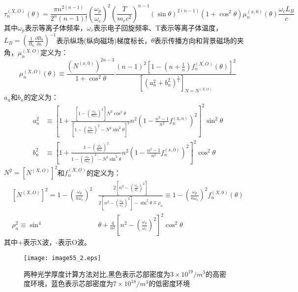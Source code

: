 \begin{equation}\label{eq:tauB}
\tau_{n}^{(X,O)}(\theta)=\frac{\pi n^{2(n-1)}}{2^{n}(n-1) !}\left(\frac{\omega_{p}}{\omega_{c}}\right)^{2}\left(\frac{T}{m_e c^{2}}\right)^{n-1}(\sin \theta)^{2(n-1)}\left(1+\cos ^{2} \theta\right) \mu_{n}^{(x, 0)}(\theta) \frac{\omega_{c} L_{B}}{c}
\end{equation}
其中$ω_p$表示等离子体频率，$ω_c$表示电子回旋频率、T表示等离子体温度，$L_B=\left(\frac{1}{B_{0}} \frac{\partial B_{0}}{\partial s}\right)^{-1}$表示纵场(纵向磁场)梯度标长，$θ$表示传播方向和背景磁场的夹角，$μ_n^{(X,O) }$定义为：
\begin{equation}
\mu_{n}^{(X, O)}(\theta) \equiv \frac{\left(N^{(x, 0)}\right)^{2 n-3}}{1+\cos ^{2} \theta} \frac{(n-1)^{2}\left[1-\left(n+\frac{1}{n}\right) f_{n}^{(X, O)}(\theta)\right]^{2}}{\left[\left(a_{n}^{2}+b_{n}^{2}\right)^{\frac{1}{2}}\right]_{N=N^{(X, O)}}}
\end{equation}
$a_n$和$b_n$的定义为：
\begin{align}
a_{n}^{2}& \equiv\left[1+\frac{\left[1-\left(\frac{\omega_{p}}{n \omega_{c}}\right)^{2}\right] N^{2} \cos ^{2} \theta}{\left[1-\left(\frac{\omega_{p}}{n \omega_{c}}\right)^{2}-N^{2} \sin ^{2} \theta\right]^{2}} n^{2}\left(1-\frac{n^{2}-1}{n^{2}} f_{n}^{(\mathrm{x}, \mathrm{o})}\right)^{2}\right]^{2} \sin ^{2} \theta \\
b_{n}^{2} &\equiv\left[1+\frac{1-\left(\frac{\omega_{p}}{n \omega_{c}}\right)^{2}}{1-\left(\frac{\omega_{p}}{n \omega_{c}}\right)^{2}-N^{2} \sin ^{2} \theta} n^{2}\left(1-\frac{n^{2}-1}{n^{2}} f_{n}^{(x, 0)}\right)^{2}\right]^{2} \cos ^{2} \theta
\end{align}
$N^2=\left [N^{(X,O)} \right]^2$和$f_n^{(X,O) }$的定义为：
\begin{align}
\left[N^{(X, O)}\right]^{2} = 1-\left(\frac{\omega_{p}}{n \omega_{c}}\right)^{2}& \frac{2\left[n^{2}-\left(\frac{\omega_{p}}{\omega_{c}}\right)^{2}\right]}{2\left[n^{2}-\left(\frac{\omega_{p}}{\omega_{c}}\right)^{2}\right]-\sin ^{2} \theta \mp  
\rho_{n}} \equiv 1-\left(\frac{\omega_{p}}{n \omega_{c}}\right)^{2} f_{n}^{(X, 0)}(\theta) \\
\rho_{n}^{2} \equiv \sin ^{4} &\theta+\frac{4}{n^{2}}\left[n^{2}-\left(\frac{\omega_{p}}{\omega_{c}}\right)^{2}\right]^{2} \cos ^{2} \theta
\end{align}
其中+表示X波，-表示O波。
\begin{figure}[H]
\centering
\texttt{[image: image55\_2.eps]}
\caption{\label{fig:tauc}两种光学厚度计算方法对比,黑色表示芯部密度为$3\times10^{19}/m^3$的高密度环境，蓝色表示芯部密度为$7\times10^{18}/m^3$的低密度环境}
\end{figure}
